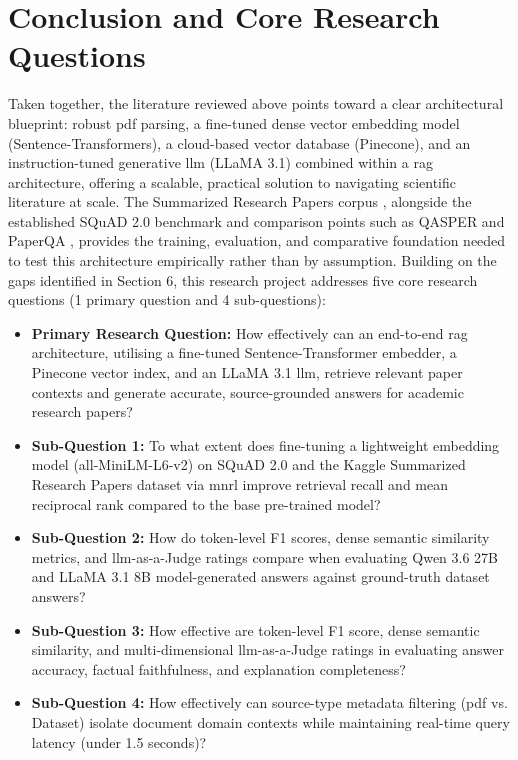\section{Conclusion and Core Research Questions}

Taken together, the literature reviewed above points toward a clear architectural blueprint: robust \gls{pdf} parsing, a fine-tuned dense vector embedding model (Sentence-Transformers), a cloud-based vector database (Pinecone), and an instruction-tuned generative \gls{llm} (LLaMA 3.1) combined within a \gls{rag} architecture, offering a scalable, practical solution to navigating scientific literature at scale. The Summarized Research Papers corpus \citep{tyagi2024summarized}, alongside the established SQuAD 2.0 benchmark and comparison points such as QASPER \citep{dasigi2021dataset} and PaperQA \citep{lala2023paperqa}, provides the training, evaluation, and comparative foundation needed to test this architecture empirically rather than by assumption.
\newline \newline Building on the gaps identified in Section 6, this research project addresses five core research questions (1 primary question and 4 sub-questions):

\begin{itemize}
    \item \textbf{Primary Research Question:} How effectively can an end-to-end \gls{rag} architecture, utilising a fine-tuned Sentence-Transformer embedder, a Pinecone vector index, and an LLaMA 3.1 \gls{llm}, retrieve relevant paper contexts and generate accurate, source-grounded answers for academic research papers?
    \item \textbf{Sub-Question 1:} To what extent does fine-tuning a lightweight embedding model (all-MiniLM-L6-v2) on SQuAD 2.0 and the Kaggle Summarized Research Papers dataset via \gls{mnrl} improve retrieval recall and mean reciprocal rank compared to the base pre-trained model?
    \item \textbf{Sub-Question 2:} How do token-level F1 scores, dense semantic similarity metrics, and \gls{llm}-as-a-Judge ratings compare when evaluating Qwen 3.6 27B and LLaMA 3.1 8B model-generated answers against ground-truth dataset answers?
    \item \textbf{Sub-Question 3:} How effective are token-level F1 score, dense semantic similarity, and multi-dimensional \gls{llm}-as-a-Judge ratings in evaluating answer accuracy, factual faithfulness, and explanation completeness?
    \item \textbf{Sub-Question 4:} How effectively can source-type metadata filtering (\gls{pdf} vs. Dataset) isolate document domain contexts while maintaining real-time query latency (under 1.5 seconds)?
\end{itemize}

